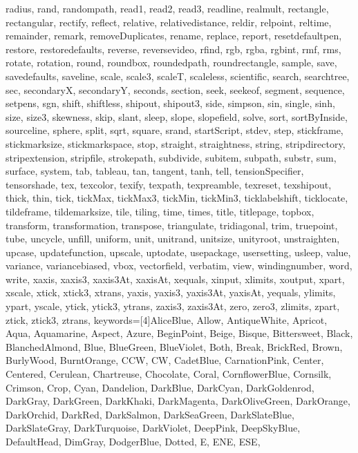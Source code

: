 {{  radius, rand, randompath, read1, read2, read3, readline, realmult, rectangle,
  rectangular, rectify, reflect, relative, relativedistance, reldir, relpoint,
  reltime, remainder, remark, removeDuplicates, rename, replace, report,
  resetdefaultpen, restore, restoredefaults, reverse, reversevideo, rfind, rgb,
  rgba, rgbint, rmf, rms, rotate, rotation, round, roundbox, roundedpath,
  roundrectangle, sample, save, savedefaults, saveline, scale, scale3, scaleT,
  scaleless, scientific, search, searchtree, sec, secondaryX, secondaryY,
  seconds, section, seek, seekeof, segment, sequence, setpens, sgn, shift,
  shiftless, shipout, shipout3, side, simpson, sin, single, sinh, size, size3,
  skewness, skip, slant, sleep, slope, slopefield, solve, sort, sortByInside,
  sourceline, sphere, split, sqrt, square, srand, startScript, stdev, step,
  stickframe, stickmarksize, stickmarkspace, stop, straight, straightness,
  string, stripdirectory, stripextension, stripfile, strokepath, subdivide,
  subitem, subpath, substr, sum, surface, system, tab, tableau, tan, tangent,
  tanh, tell, tensionSpecifier, tensorshade, tex, texcolor, texify, texpath,
  texpreamble, texreset, texshipout, thick, thin, tick, tickMax, tickMax3,
  tickMin, tickMin3, ticklabelshift, ticklocate, tildeframe, tildemarksize,
  tile, tiling, time, times, title, titlepage, topbox, transform,
  transformation, transpose, triangulate, tridiagonal, trim, truepoint, tube,
  uncycle, unfill, uniform, unit, unitrand, unitsize, unityroot, unstraighten,
  upcase, updatefunction, upscale, uptodate, usepackage, usersetting, usleep,
  value, variance, variancebiased, vbox, vectorfield, verbatim, view,
  windingnumber, word, write, xaxis, xaxis3, xaxis3At, xaxisAt, xequals,
  xinput, xlimits, xoutput, xpart, xscale, xtick, xtick3, xtrans, yaxis,
  yaxis3, yaxis3At, yaxisAt, yequals, ylimits, ypart, yscale, ytick, ytick3,
  ytrans, zaxis3, zaxis3At, zero, zero3, zlimits, zpart, ztick, ztick3,
  ztrans},
  keywords=[4]{AliceBlue, Allow, AntiqueWhite, Apricot, Aqua, Aquamarine,
  Aspect, Azure, BeginPoint, Beige, Bisque, Bittersweet, Black, BlanchedAlmond,
  Blue, BlueGreen, BlueViolet, Both, Break, BrickRed, Brown, BurlyWood,
  BurntOrange, CCW, CW, CadetBlue, CarnationPink, Center, Centered, Cerulean,
  Chartreuse, Chocolate, Coral, CornflowerBlue, Cornsilk, Crimson, Crop, Cyan,
  Dandelion, DarkBlue, DarkCyan, DarkGoldenrod, DarkGray, DarkGreen, DarkKhaki,
  DarkMagenta, DarkOliveGreen, DarkOrange, DarkOrchid, DarkRed, DarkSalmon,
  DarkSeaGreen, DarkSlateBlue, DarkSlateGray, DarkTurquoise, DarkViolet,
  DeepPink, DeepSkyBlue, DefaultHead, DimGray, DodgerBlue, Dotted, E, ENE, ESE,
}}
